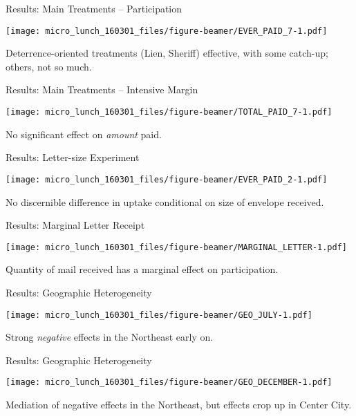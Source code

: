 \documentclass[ignorenonframetext,]{beamer}
\begin{document}
\begin{frame}{Results: Main Treatments -- Participation}

\texttt{[image: micro\_lunch\_160301\_files/figure-beamer/EVER\_PAID\_7-1.pdf]}

Deterrence-oriented treatments (Lien, Sheriff) effective, with some
catch-up; others, not so much.

\end{frame}

\begin{frame}{Results: Main Treatments -- Intensive Margin}

\texttt{[image: micro\_lunch\_160301\_files/figure-beamer/TOTAL\_PAID\_7-1.pdf]}

No significant effect on \emph{amount} paid.

\end{frame}

\begin{frame}{Results: Letter-size Experiment}

\texttt{[image: micro\_lunch\_160301\_files/figure-beamer/EVER\_PAID\_2-1.pdf]}

No discernible difference in uptake conditional on size of envelope
received.

\end{frame}

\begin{frame}{Results: Marginal Letter Receipt}

\texttt{[image: micro\_lunch\_160301\_files/figure-beamer/MARGINAL\_LETTER-1.pdf]}

Quantity of mail received has a marginal effect on participation.

\end{frame}

\begin{frame}{Results: Geographic Heterogeneity}

\texttt{[image: micro\_lunch\_160301\_files/figure-beamer/GEO\_JULY-1.pdf]}

Strong \emph{negative} effects in the Northeast early on.

\end{frame}

\begin{frame}{Results: Geographic Heterogeneity}

\texttt{[image: micro\_lunch\_160301\_files/figure-beamer/GEO\_DECEMBER-1.pdf]}

Mediation of negative effects in the Northeast, but effects crop up in
Center City.

\end{frame}
\end{document}
